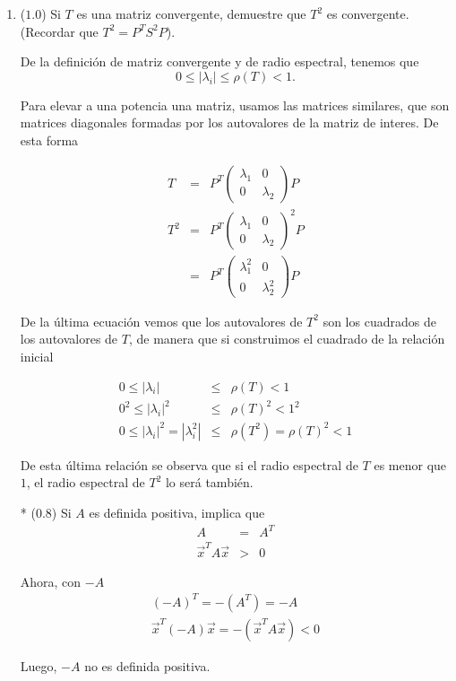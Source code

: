 \documentclass[12pt]{article}
\begin{document}
\begin{enumerate}[leftmargin=*,widest=9]
\begin{enumerate}[label=\alph*]
    \end{enumerate}
    
  \item (\(1.0\)) Si \(T\) es una matriz convergente, demuestre que \(T^2\) es convergente. (Recordar que \(T^2 = P^T S^2 P\)).
  
  De la definición de matriz convergente y de radio espectral, tenemos que 
  \[ 0 \leq |\lambda_i| \leq \rho(T) < 1.\]
  
  Para elevar a una potencia una matriz, usamos las matrices similares, que son matrices diagonales formadas por los autovalores de la matriz de interes. De esta forma
  
  \begin{eqnarray*}
  T & = & P^T \begin{pmatrix}
  \lambda_1 & 0\\ 0 & \lambda_2
  \end{pmatrix} P\\
  T^2 & = & P^T \begin{pmatrix}
  \lambda_1 & 0\\ 0 & \lambda_2
  \end{pmatrix}^2 P\\
  & = & P^T \begin{pmatrix}
  \lambda_1^2 & 0\\ 0 & \lambda_2^2
  \end{pmatrix} P
  \end{eqnarray*}
  
  De la última ecuación vemos que los autovalores de \(T^2\) son los cuadrados de los autovalores de \(T\), de manera que si construimos el cuadrado de la relación inicial
  
  \begin{eqnarray*}
  0 \leq |\lambda_i| &\leq& \rho(T) < 1 \\
  0^2 \leq |\lambda_i|^2 &\leq& \rho(T)^2 < 1^2\\
  0 \leq |\lambda_i|^2 = |\lambda_i^2| &\leq& \rho(T^2) = \rho(T)^2 < 1
  \end{eqnarray*}
  
  De esta última relación se observa que si el radio espectral de \(T\) es menor que \(1\), el radio espectral de \(T^2\) lo será también.
  
  * (\(0.8\)) 
  Si \(A\) es definida positiva, implica que 
  \begin{eqnarray*}
  A &=& A^T\\
  \vec{x}^T A \vec{x} &>& 0
  \end{eqnarray*}
  
  Ahora, con \(-A\)
  \begin{eqnarray*}
  (-A)^T = -(A^T) = -A  \\
  \vec{x}^T (-A) \vec{x} = -(\vec{x}^T A \vec{x}) < 0
  \end{eqnarray*}
  
  Luego, \(-A\) no es definida positiva.
    
  \end{enumerate}
\end{document}
